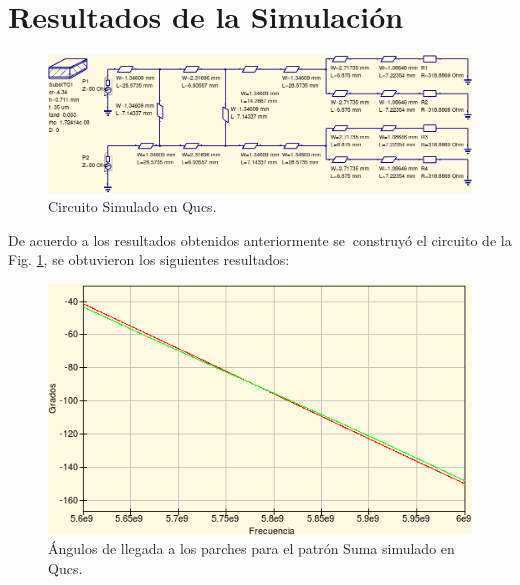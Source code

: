 \documentclass[twocolumn]{IEEEtran}
\begin{document}
\section{Resultados de la Simulación}
\begin{figure}[H]
	\centering
		\includegraphics[scale=0.34]{qucs.png}
	\caption{Circuito Simulado en Qucs.}
	\label{fig6}
\end{figure}
\noindent
De acuerdo a los resultados obtenidos anteriormente se $\ $construyó el circuito de la Fig. \ref{fig6}, se obtuvieron los siguientes resultados:
\begin{figure}[H]
	\centering
		\includegraphics[scale=0.6]{suma.png}
	\caption{Ángulos de llegada a los parches para el patrón Suma simulado en Qucs.}
	\label{fig7}
\end{figure}
\end{document}
